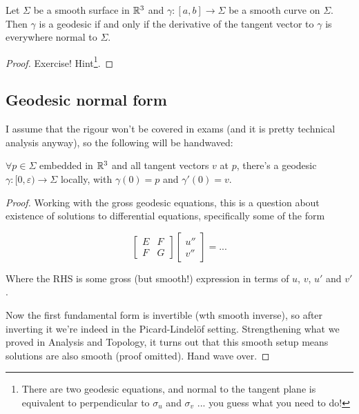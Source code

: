 \documentclass[11pt]{scrartcl}
\begin{document}
\begin{proposition}
Let $\Sigma$ be a smooth surface in $\mathbb R^3$ and $\gamma : [a, b] \rightarrow \Sigma$ be a smooth curve on $\Sigma$. Then $\gamma$ is a geodesic if and only if the derivative of the tangent vector to $\gamma$ is everywhere normal to $\Sigma$.

\begin{proof}
Exercise! Hint\footnote{There are two geodesic equations, and normal to the tangent plane is equivalent to perpendicular to $\sigma_u$ and $\sigma_v$ ... you guess what you need to do!}.
\end{proof}
\end{proposition}

\subsection{Geodesic normal form}

I assume that the rigour won't be covered in exams (and it is pretty technical analysis anyway), so the following will be handwaved:

\begin{proposition}

$\forall p \in \Sigma$ embedded in $\mathbb R^3$ and all tangent vectors $v$ at $p$, there's a geodesic $\gamma : [0, \varepsilon) \rightarrow \Sigma$ locally, with $\gamma(0) = p$ and $\gamma'(0) = v$.

\begin{proof}
Working with the gross geodesic equations, this is a question about existence of solutions to differential equations, specifically some of the form

\begin{equation}
\begin{bmatrix}
E & F \\
F & G
\end{bmatrix}
\begin{bmatrix}
u'' \\
v''
\end{bmatrix}
=
...
\end{equation}

Where the RHS is some gross (but smooth!) expression in terms of $u$, $v$, $u'$ and $v'$.

Now the first fundamental form is invertible (wth smooth inverse), so after inverting it we're indeed in the Picard-Lindel{\"o}f setting. Strengthening what we proved in Analysis and Topology, it turns out that this smooth setup means solutions are also smooth (proof omitted). Hand wave over.
\end{proof}
\end{proposition}
\end{document}
